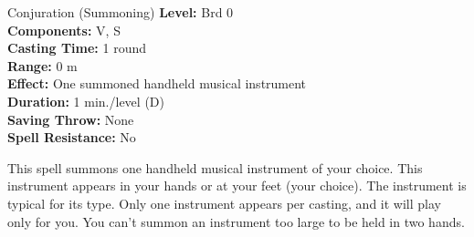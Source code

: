 {Conjuration (Summoning)}
{
	\textbf{Level:}
	Brd 0\\
	\textbf{Components:}
	V, S\\
	\textbf{Casting Time:}
	1 round\\
	\textbf{Range:}
	0 m\\
	\textbf{Effect:}
	One summoned handheld musical instrument\\
	\textbf{Duration:}
	1 min./level (D)\\
	\textbf{Saving Throw:}
	None\\
	\textbf{Spell Resistance:}
	No\\
}
{
	This spell summons one handheld musical instrument of your choice. This instrument appears in your hands or at your feet (your choice). The instrument is typical for its type. Only one instrument appears per casting, and it will play only for you. You can't summon an instrument too large to be held in two hands.

}

